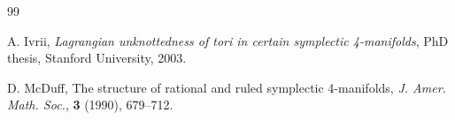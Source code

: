 \documentclass[12pt]{amsart}
\theoremstyle{definition}
\begin{document}
\begin{thebibliography} {99}


 A. Ivrii, {\it Lagrangian unknottedness of tori in certain symplectic 4-manifolds}, PhD thesis, Stanford University, 2003.





 D. McDuff, The structure of rational and ruled symplectic 4-manifolds,
{\it J. Amer. Math. Soc.}, \textbf{3} (1990), 679--712.









\end{thebibliography}
\end{document}
